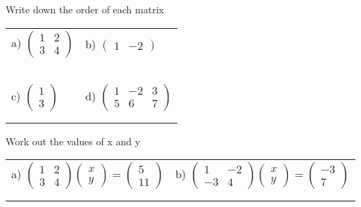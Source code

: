 \documentclass[fontsize=12pt]{scrartcl}
\begin{document}
\newpage
Write down the order of each matrix
\newline
\newline
\begin{tabular}{p{9cm}p{9cm}}
a) $\begin{pmatrix}1&2\\3&4 \end{pmatrix}$
&b) $\begin{pmatrix}1&-2 \end{pmatrix}$
\\\\\\
\\\\\\

c) $\begin{pmatrix}1\\3 \end{pmatrix}$
&d) $\begin{pmatrix}1&-2&3\\5&6&7 \end{pmatrix}$
\\\\\\
\end{tabular}
\newpage
Work out the values of x and y
\newline
\newline
\begin{tabular}{p{9cm}p{9cm}}
a) $\begin{pmatrix}1&2\\3&4\end{pmatrix}\begin{pmatrix}x\\y\end{pmatrix}=\begin{pmatrix}5\\11\end{pmatrix}$
&b) $\begin{pmatrix}1&-2\\-3&4\end{pmatrix}\begin{pmatrix}x\\y\end{pmatrix}=\begin{pmatrix}-3\\7\end{pmatrix}$
\\\\\\
\end{tabular}
\end{document}
